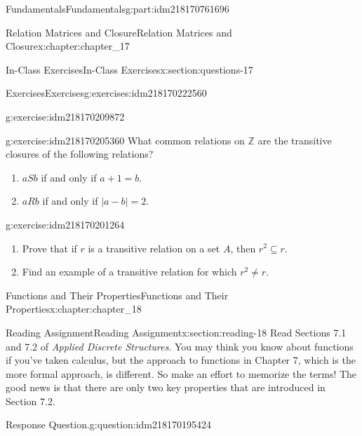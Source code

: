\documentclass[oneside,10pt,]{book}
\numberwithin{equation}{section}
\begin{document}
\begin{partptx}{Fundamentals}{}{Fundamentals}{}{}{g:part:idm218170761696}
\begin{chapterptx}{Relation Matrices and Closure}{}{Relation Matrices and Closure}{}{}{x:chapter:chapter_17}
\begin{sectionptx}{In-Class Exercises}{}{In-Class Exercises}{}{}{x:section:questions-17}
\begin{exercises-subsection-numberless}{Exercises}{}{Exercises}{}{}{g:exercises:idm218170222560}
\begin{exercisegroup}
\begin{divisionexerciseeg}{2}{}{}{g:exercise:idm218170209872}
%
\end{divisionexerciseeg}%
\begin{divisionexerciseeg}{3}{}{}{g:exercise:idm218170205360}%
What common relations on \(\mathbb{Z}\) are the transitive closures of the following relations?%
\par
%
\begin{enumerate}[label=(\alph*)]
\item{}\(a S b\) if and only if \(a + 1 = b\).%
\item{}\(a R b\) if and only if \(| a - b | = 2\).%
\end{enumerate}
%
\end{divisionexerciseeg}%
\begin{divisionexerciseeg}{4}{}{}{g:exercise:idm218170201264}%
%
\begin{enumerate}[label=(\alph*)]
\item{}Prove that if \(r\) is a transitive relation on a set \(A\), then \(r^2 \subseteq  r\).%
\item{}Find an example of a transitive relation for which \(r^2\neq r\).%
\end{enumerate}
%
\end{divisionexerciseeg}%
\end{exercisegroup}
\par\medskip\noindent
\end{exercises-subsection-numberless}
\end{sectionptx}
\end{chapterptx}
%
\typeout{************************************************}
\typeout{************************************************}
%
\begin{chapterptx}{Functions and Their Properties}{}{Functions and Their Properties}{}{}{x:chapter:chapter_18}
%
%
%
\typeout{************************************************}
\typeout{************************************************}
%
\begin{sectionptx}{Reading Assignment}{}{Reading Assignment}{}{}{x:section:reading-18}
Read Sections 7.1 and 7.2 of \emph{Applied Discrete Structures}.  You may think you know about functions if you've taken calculus, but the approach to functions in Chapter 7, which is the more formal approach, is different. So make an effort to memorize the terms!  The good news is that there are only two key properties that are introduced in Section 7.2.%
\begin{question}{Response Question.}{g:question:idm218170195424}%

\end{question}
\end{sectionptx}
\end{chapterptx}
\end{partptx}
\end{document}
